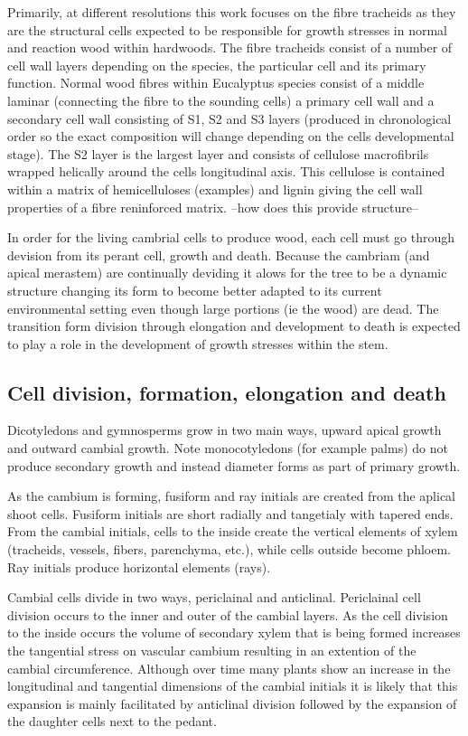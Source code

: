 \documentclass{article}
\begin{document}
Primarily, at different resolutions this work focuses on the fibre tracheids as
they are the structural cells expected to be responsible for growth stresses in
normal and reaction wood within hardwoods. The fibre tracheids consist of a
number of cell wall layers depending on the species, the particular cell and
its primary function. Normal wood fibres within Eucalyptus species
consist of a middle laminar (connecting the fibre to the sounding cells) a
primary cell wall and a secondary cell wall consisting of S1, S2 and S3 layers
(produced in chronological order so the exact composition will change depending
on the cells developmental stage). The S2 layer is the largest layer and
consists of cellulose macrofibrils wrapped helically around the cells
longitudinal axis. This cellulose is contained within a matrix of hemicelluloses (examples)
and lignin giving the cell wall properties of a fibre reninforced matrix. --how
does this provide structure--

In order for the living cambrial cells to produce wood, each cell must go
through devision from its perant cell, growth and death. Because the
cambriam (and apical merastem) are continually deviding it alows for the tree to be a dynamic
structure changing its form to become better adapted to its current environmental
setting even though large portions (ie the wood) are dead. The transition form
division through elongation and development to death is expected to play a role
in the development of growth stresses within the stem.

\subsection{Cell division, formation, elongation and death}
Dicotyledons and gymnosperms grow in two main ways, upward apical growth and
outward cambial growth. Note monocotyledons (for example palms) do not produce
secondary growth and instead diameter forms as part of primary growth.

As the cambium is forming, fusiform and ray initials are created from the
aplical shoot cells. Fusiform initials are short radially and tangetialy with
tapered ends. From the cambial initials, cells to the inside create the vertical
elements of xylem (tracheids, vessels, fibers, parenchyma, etc.), while cells outside become phloem.
Ray initials produce horizontal elements (rays).

Cambial cells divide in two ways, periclainal and anticlinal.
Periclainal cell division occurs to the inner and outer of the cambial layers.
As the cell division to the inside occurs the volume of secondary xylem that is being
formed increases the tangential stress on vascular cambium resulting in an
extention of the cambial circumference. Although over time many plants show an
increase in the longitudinal and tangential dimensions of the cambial initials it is
likely that this expansion is mainly facilitated by anticlinal division followed
by the expansion of the daughter cells next to the pedant.
\end{document}
